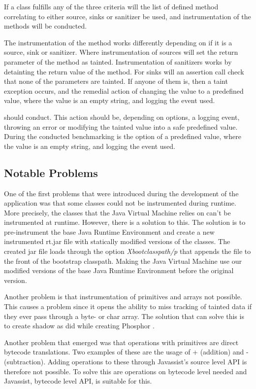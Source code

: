 If a class fulfills any of the three criteria will the list of defined method correlating to either source, sinks or sanitizer be used, and instrumentation of the methods will be conducted.

The instrumentation of the method works differently depending on if it is a source, sink or sanitizer. Where instrumentation of sources will set the return parameter of the method as tainted. Instrumentation of sanitizers works by detainting the return value of the method. For sinks will an assertion call check that none of the parameters are tainted. If anyone of them is, then a taint exception occurs, and the remedial action of changing the value to a predefined value, where the value is an empty string, and logging the event used.

should conduct. This action should be, depending on options, a logging event, throwing an error or modifying the tainted value into a safe predefined value. During the conducted benchmarking is the option of a predefined value, where the value is an empty string, and logging the event used.



\subsection{Notable Problems}
\label{NotableProblems}
One of the first problems that were introduced during the development of the application was that some classes could not be instrumented during runtime. More precisely, the classes that the Java Virtual Machine relies on can't be instrumented at runtime. However, there is a solution to this. The solution is to pre-instrument the base Java Runtime Environment and create a new instrumented rt.jar file with statically modified versions of the classes. The created jar file loads through the option \textit{Xbootclasspath/p} that appends the file to the front of the bootstrap classpath. Making the Java Virtual Machine use our modified versions of the base Java Runtime Environment \parencite{xboot} before the original version.

Another problem is that instrumentation of primitives and arrays not possible. This causes a problem since it opens the ability to miss tracking of tainted data if they ever pass through a byte- or char array. The solution that can solve this is to create shadow as \textcite{BellJ.2014PIdd} did while creating Phosphor \parencite{phosphor}. 

Another problem that emerged was that operations with primitives are direct bytecode translations. Two examples of these are the usage of + (addition) and - (subtraction). Adding operations to these through Javassist's source level API is therefore not possible. To solve this are operations on bytecode level needed and Javassist, bytecode level API, is suitable for this. \parencite{Javassist} 
